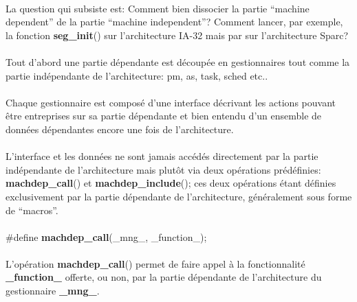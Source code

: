 \documentclass[10pt,a4wide]{article}
\begin{document}
\paragraph{}

La question qui subsiste est: Comment bien dissocier la partie ``machine
dependent'' de la partie ``machine independent''? Comment lancer, par
exemple, la fonction \textbf{seg\_init}() sur l'architecture IA-32 mais par sur
l'architecture Sparc?

\paragraph{}

Tout d'abord une partie d\'ependante est d\'ecoup\'ee en gestionnaires
tout comme la partie ind\'ependante de l'architecture: pm, as,
task, sched etc..

\paragraph{}

Chaque gestionnaire est compos\'e d'une interface d\'ecrivant les actions
pouvant \^etre entreprises sur sa partie d\'ependante et bien entendu d'un
ensemble de donn\'ees d\'ependantes encore une fois de l'architecture.

\paragraph{}

L'interface et les donn\'ees ne sont jamais acc\'ed\'es directement
par la partie ind\'ependante de l'architecture mais plut\^ot via
deux op\'erations pr\'ed\'efinies: \textbf{machdep\_call}() et
\textbf{machdep\_include}(); ces deux op\'erations \'etant d\'efinies
exclusivement par la partie d\'ependante de l'architecture,
g\'en\'eralement sous forme de ``macros''.

\paragraph{}

\hspace{1.5cm}\#define \textbf{machdep\_call}(\_mng\_, \_function\_);

\paragraph{}

L'op\'eration \textbf{machdep\_call}() permet de faire appel \`a la
fonctionnalit\'e \textbf{\_function\_} offerte, ou non, par
la partie d\'ependante de l'architecture du gestionnaire
\textbf{\_mng\_}.
\end{document}
